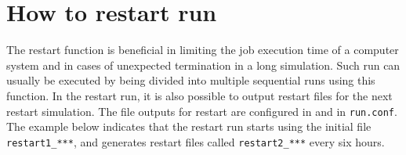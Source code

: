 \section{How to restart run}\label{sec:restart}
The restart function is beneficial in limiting the job execution time of a computer system and in cases of unexpected termination in a long simulation.
Such run can usually be executed by being divided into multiple sequential runs using this function. In the restart run, it is also possible to output restart files for the next restart simulation. The file outputs for restart are configured in  and  in \verb|run.conf|. The example below indicates that the restart run starts using the initial file \verb|restart1_***|, and generates restart files called \verb|restart2_***| every six hours.
